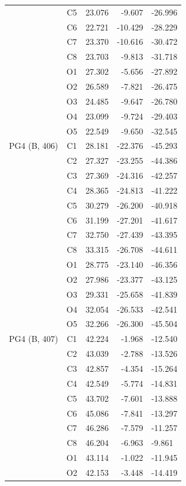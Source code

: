 \begin{longtable}{@{}lcrr@{}}
   & C5 & 23.076 & -9.607 & -26.996 \\
   & C6 & 22.721 & -10.429 & -28.229 \\
   & C7 & 23.370 & -10.616 & -30.472 \\
   & C8 & 23.703 & -9.813 & -31.718 \\
   & O1 & 27.302 & -5.656 & -27.892 \\
   & O2 & 26.589 & -7.821 & -26.475 \\
   & O3 & 24.485 & -9.647 & -26.780 \\
   & O4 & 23.099 & -9.724 & -29.403 \\
   & O5 & 22.549 & -9.650 & -32.545 \\
  \cmidrule(r){1-5}
  PG4 (B, 406) & C1 & 28.181 & -22.376 & -45.293 \\
   & C2 & 27.327 & -23.255 & -44.386 \\
   & C3 & 27.369 & -24.316 & -42.257 \\
   & C4 & 28.365 & -24.813 & -41.222 \\
   & C5 & 30.279 & -26.200 & -40.918 \\
   & C6 & 31.199 & -27.201 & -41.617 \\
   & C7 & 32.750 & -27.439 & -43.395 \\
   & C8 & 33.315 & -26.708 & -44.611 \\
   & O1 & 28.775 & -23.140 & -46.356 \\
   & O2 & 27.986 & -23.377 & -43.125 \\
   & O3 & 29.331 & -25.658 & -41.839 \\
   & O4 & 32.054 & -26.533 & -42.541 \\
   & O5 & 32.266 & -26.300 & -45.504 \\
  \cmidrule(r){1-5}
  PG4 (B, 407) & C1 & 42.224 & -1.968 & -12.540 \\
   & C2 & 43.039 & -2.788 & -13.526 \\
   & C3 & 42.857 & -4.354 & -15.264 \\
   & C4 & 42.549 & -5.774 & -14.831 \\
   & C5 & 43.702 & -7.601 & -13.888 \\
   & C6 & 45.086 & -7.841 & -13.297 \\
   & C7 & 46.286 & -7.579 & -11.257 \\
   & C8 & 46.204 & -6.963 & -9.861 \\
   & O1 & 43.114 & -1.022 & -11.945 \\
   & O2 & 42.153 & -3.448 & -14.419 \\

\end{longtable}
